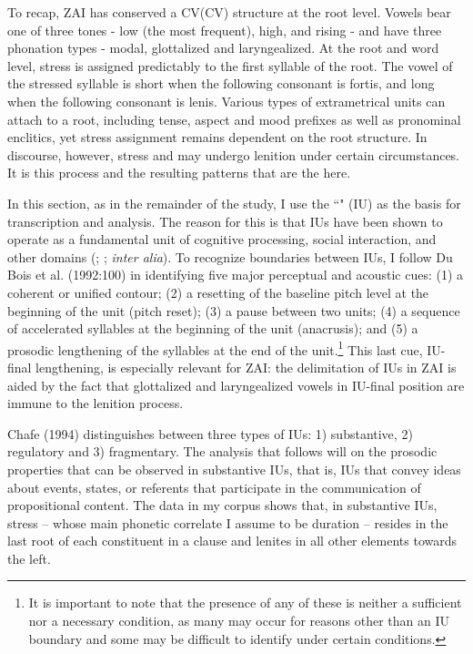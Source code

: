 To recap, ZAI has conserved a CV(CV) structure at the root level. Vowels bear one of three tones - low (the most frequent), high, and rising - and have three phonation types - modal, glottalized and laryngealized. At the root and word level, stress is assigned predictably to the first syllable of the root. The vowel of the stressed syllable is short when the following consonant is fortis, and long when the following consonant is lenis. Various types of extrametrical units can attach to a root, including tense, aspect and mood prefixes as well as pronominal enclitics, yet stress assignment remains dependent on the root structure. In discourse, however, stress and  may undergo lenition under certain circumstances. It is this process and the resulting patterns that are the  here.  

In this section, as in the remainder of the study, I use the ``" (IU) \citep{chafe1994} as the basis for transcription and analysis. The reason for this is that IUs have been shown to operate as a fundamental unit of cognitive processing, social interaction, and other domains (\citealt{chafe1994}; \citealt{dubois1993}; \textit{inter alia}). To recognize boundaries between IUs, I follow Du Bois et al. (1992:100) in identifying five major perceptual and acoustic cues: (1) a coherent or unified  contour; (2) a resetting of the baseline pitch level at the beginning of the unit (pitch reset); (3) a pause between two units; (4) a sequence of accelerated syllables at the beginning of the unit (anacrusis); and (5) a prosodic lengthening of the syllables at the end of the unit.\footnote{It is important to note that the presence of any of these is neither a sufficient nor a necessary condition, as many may occur for reasons other than an IU boundary and some may be difficult to identify under certain conditions.} This last cue, IU-final lengthening, is especially relevant for ZAI: the delimitation of IUs in ZAI is aided by the fact that  glottalized and laryngealized vowels in IU-final position are immune to the lenition process.

Chafe (1994) distinguishes between three types of IUs: 1) substantive, 2) regulatory and 3) fragmentary. The analysis that follows will  on the prosodic properties that can be observed in substantive IUs, that is, IUs that convey ideas about events, states, or referents that participate in the communication of propositional content. The data in my corpus shows that, in substantive IUs, stress -- whose main phonetic correlate I assume to be duration -- resides in the last root of each constituent in a clause and lenites in all other elements towards the left. 

